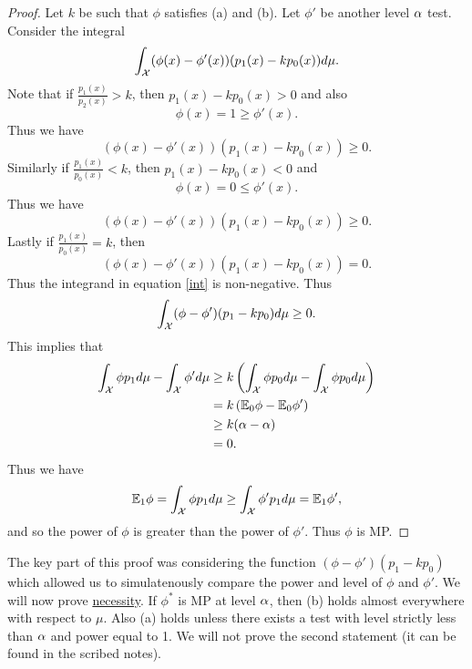 \begin{proof}
    Let $k$ be such that $\phi$ satisfies (a) and (b). Let $\phi'$ be another level ${\alpha}$ test. Consider the integral
    \begin{equation}\label{int}
        \int_{\mathcal{X}} (\phi(x)-\phi'(x))(p_1(x)-kp_0(x))d\mu.
    \end{equation}
    Note that if $\frac{p_1(x)}{p_2(x)} > k$, then $p_1(x)-kp_0(x) > 0$ and also 
    \[\phi(x) = 1 \ge \phi'(x). \]
    Thus we have 
    \[ (\phi(x)-\phi'(x))(p_1(x)-kp_0(x)) \ge 0.\]
    Similarly if $\frac{p_1(x)}{p_0(x)} < k$, then $p_1(x)-kp_0(x) < 0$ and 
    \[\phi(x) = 0 \le \phi'(x). \]
    Thus we have
    \[(\phi(x)-\phi'(x))(p_1(x)-kp_0(x)) \ge 0. \]
    Lastly if $\frac{p_1(x)}{p_0(x)} = k$, then 
    \[(\phi(x)-\phi'(x))(p_1(x)-kp_0(x))=0. \]
    Thus the integrand in equation \eqref{int} is non-negative. Thus 
    \[\int_{\mathcal{X}} (\phi-\phi')(p_1-kp_0)d\mu \ge 0. \]
    This implies that 
    \begin{align*}
        \int_{\mathcal{X}} \phi p_1d\mu - \int_{\mathcal{X}} \phi' d\mu & \ge k\left(\int_{\mathcal{X}} \phi p_0d\mu - \int_{\mathcal{X}} \phi p_0d\mu \right)\\
        &= k\left({\mathbb{E}}_0 \phi - {\mathbb{E}}_0 \phi'\right)\\
        &\ge k({\alpha}-{\alpha})\\
        &=0.
    \end{align*}
    Thus we have 
    \[{\mathbb{E}}_1 \phi = \int_{\mathcal{X}} \phi p_1d\mu \ge \int_{\mathcal{X}} \phi' p_1d\mu = {\mathbb{E}}_1 \phi', \]
    and so the power of $\phi$ is greater than the power of $\phi'$. Thus $\phi$ is MP.
\end{proof}
The key part of this proof was considering the function $(\phi-\phi')(p_1-kp_0)$ which allowed us to simulatenously compare the power and level of $\phi$ and $\phi'$. We will now prove \underline{necessity}. If $\phi^*$ is MP at level ${\alpha}$, then (b) holds almost everywhere with respect to $\mu$. Also (a) holds unless there exists a test with level strictly less than ${\alpha}$ and power equal to 1. We will not prove the second statement (it can be found in the scribed notes).
